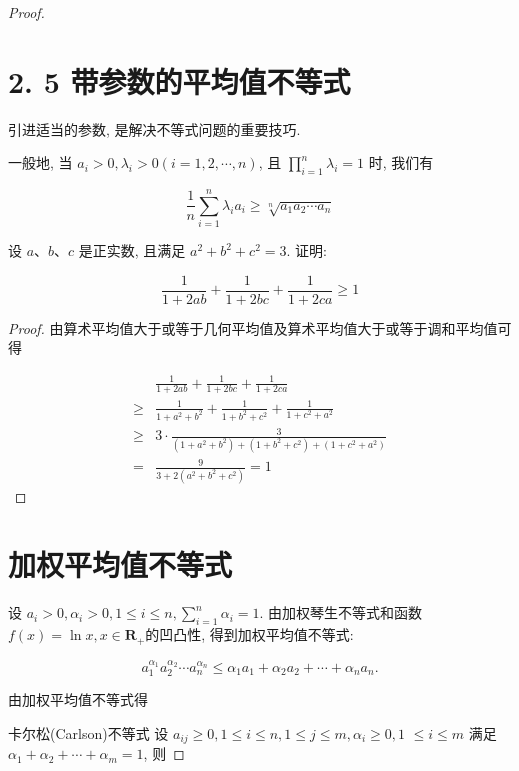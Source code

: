 \begin{proof}
	
	\section*{2. 5 带参数的平均值不等式}
	引进适当的参数, 是解决不等式问题的重要技巧.
	
	一般地, 当 $a_{i}>0, \lambda_{i}>0(i=1,2, \cdots, n)$, 且 $\prod_{i=1}^{n} \lambda_{i}=1$ 时, 我们有
	
	$$
	\frac{1}{n} \sum_{i=1}^{n} \lambda_{i} a_{i} \geqslant \sqrt[n]{a_{1} a_{2} \cdots a_{n}}
	$$

\begin{example}
	设 $a 、 b 、 c$ 是正实数, 且满足 $a^{2}+b^{2}+c^{2}=3$. 证明:
	
	$$
	\frac{1}{1+2 a b}+\frac{1}{1+2 b c}+\frac{1}{1+2 c a} \geqslant 1
	$$
\end{example}
\begin{proof}
	由算术平均值大于或等于几何平均值及算术平均值大于或等于调和平均值可得
	
	$$
	\begin{aligned}
	& \frac{1}{1+2 a b}+\frac{1}{1+2 b c}+\frac{1}{1+2 c a} \\
	\geqslant & \frac{1}{1+a^{2}+b^{2}}+\frac{1}{1+b^{2}+c^{2}}+\frac{1}{1+c^{2}+a^{2}} \\
	\geqslant & 3 \cdot \frac{3}{\left(1+a^{2}+b^{2}\right)+\left(1+b^{2}+c^{2}\right)+\left(1+c^{2}+a^{2}\right)} \\
	= & \frac{9}{3+2\left(a^{2}+b^{2}+c^{2}\right)}=1
	\end{aligned}
	$$
\end{proof}

	

	\section*{加权平均值不等式}
	设 $a_{i}>0, \alpha_{i}>0,1 \leqslant i \leqslant n, \sum_{i=1}^{n} \alpha_{i}=1$. 由加权琴生不等式和函数 $f(x)=\ln x, x \in \mathbf{R}_{+}$的凹凸性, 得到加权平均值不等式:
	
	$$
	a_{1}^{\alpha_{1}} a_{2}^{\alpha_{2}} \cdots a_{n}^{\alpha_{n}} \leqslant \alpha_{1} a_{1}+\alpha_{2} a_{2}+\cdots+\alpha_{n} a_{n} .
	$$
	
	由加权平均值不等式得
	
	卡尔松(Carlson)不等式 设 $a_{i j} \geqslant 0,1 \leqslant i \leqslant n, 1 \leqslant j \leqslant m, \alpha_{i} \geqslant 0,1$ $\leqslant i \leqslant m$ 满足 $\alpha_{1}+\alpha_{2}+\cdots+\alpha_{m}=1$, 则
	

\end{proof}
